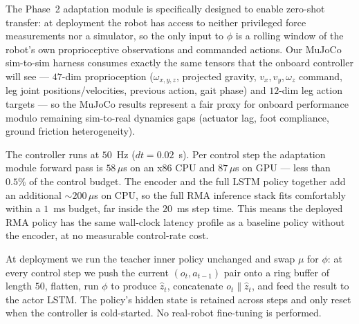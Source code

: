 The Phase~2 adaptation module is specifically designed to enable zero-shot
transfer: at deployment the robot has access to neither privileged force
measurements nor a simulator, so the only input to $\phi$ is a rolling
window of the robot's own proprioceptive observations and commanded
actions. Our MuJoCo sim-to-sim harness consumes exactly the same tensors
that the onboard controller will see --- $47$-dim proprioception
($\omega_{x,y,z}$, projected gravity, $v_x,v_y,\omega_z$ command, leg
joint positions/velocities, previous action, gait phase) and $12$-dim
leg action targets --- so the MuJoCo results represent a fair proxy for
onboard performance modulo remaining sim-to-real dynamics gaps (actuator
lag, foot compliance, ground friction heterogeneity).

The controller runs at $50$~Hz ($dt{=}0.02$~s). Per control step the
adaptation module forward pass is $58\,\mu$s on an x86 CPU and $87\,\mu$s
on GPU --- less than $0.5\%$ of the control budget. The encoder and the
full LSTM policy together add an additional $\sim\!200\,\mu$s on CPU, so
the full RMA inference stack fits comfortably within a $1$~ms budget, far
inside the $20$~ms step time. This means the deployed RMA policy has the
same wall-clock latency profile as a baseline policy without the encoder,
at no measurable control-rate cost.

At deployment we run the teacher inner policy unchanged and swap $\mu$
for $\phi$: at every control step we push the current $(o_t,a_{t-1})$
pair onto a ring buffer of length $50$, flatten, run $\phi$ to produce
$\hat z_t$, concatenate $o_t\|\hat z_t$, and feed the result to the
actor LSTM. The policy's hidden state is retained across steps and only
reset when the controller is cold-started. No real-robot fine-tuning is
performed.










\paragraph{}




















%


